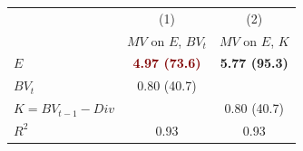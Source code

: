 \begin{tabular}{@{}lcc@{}}
\toprule
 & (1) & (2) \\
 & $MV$ on $E$, $BV_t$ & $MV$ on $E$, $K$ \\
\midrule
$E$ & \textcolor{Maroon}{\bfseries 4.97 (73.6)} & \textcolor{DeepNavy}{\bfseries 5.77 (95.3)} \\
$BV_t$ & 0.80 (40.7) & \\
$K = BV_{t-1} - Div$ & & 0.80 (40.7) \\
\midrule
$R^2$ & 0.93 & 0.93 \\
\bottomrule
\end{tabular}
